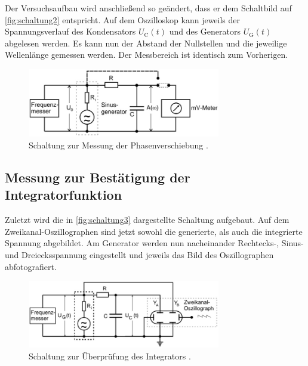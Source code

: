 \sloppy
Der Versuchsaufbau wird anschließend so geändert, dass er dem Schaltbild auf \autoref{fig:schaltung2} entspricht. Auf dem Oszilloskop kann jeweils der Spannungsverlauf des Kondensators $U_{\text{C}}(t)$ und des
Generators $U_{\text{G}}(t)$ abgelesen werden. Es kann nun der Abstand der Nullstellen und die jeweilige Wellenlänge gemessen werden. Der Messbereich ist identisch zum Vorherigen.
\begin{figure}[H]
    \centering
    \includegraphics[width=0.75\textwidth]{Dateien/Schaltung2.jpg}
    \caption{Schaltung zur Messung der Phasenverschiebung \cite{anleitung353}.}
    \label{fig:schaltung2}
\end{figure}


\subsection{Messung zur Bestätigung der Integratorfunktion}

\sloppy
Zuletzt wird die in \autoref{fig:schaltung3} dargestellte Schaltung aufgebaut. Auf dem Zweikanal-Oszillographen sind jetzt sowohl die 
generierte, als auch die integrierte Spannung abgebildet. Am Generator werden nun nacheinander Rechtecks-, Sinus- und 
Dreiecksspannung eingestellt und jeweils das Bild des Oszillographen abfotografiert.
\begin{figure}[H]
    \centering
    \includegraphics[width=0.75\textwidth]{Dateien/Schaltung3.jpg}
    \caption{Schaltung zur Überprüfung des Integrators \cite{anleitung353}.}
    \label{fig:schaltung3}
\end{figure}



